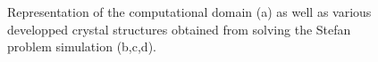 \begin{figure}[ht!]
\begin{center}
\caption{Representation of the computational domain (a) as well as various developped crystal structures obtained from solving the Stefan problem simulation (b,c,d).} \label{fig:stefan_crystals}
\end{center}
\end{figure}

